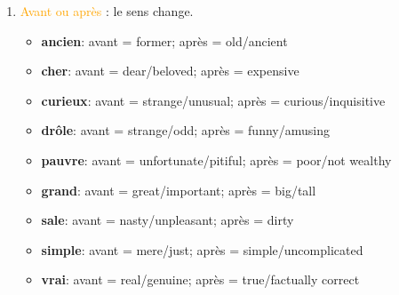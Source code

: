 \documentclass[math,code]{amznotes}
\theoremstyle{remark}
\begin{document}
\begin{enumerate}
    \begin{notebox}
        \begin{enumerate}
            \item \textbf{S'il y a plusieurs adjectifs,} chaque adjectif garde généralement sa place normale :
            \begin{itemize}
                \item de \textcolor{orange}{jeunes} collègues \textcolor{orange}{espagnols}
                \item ces \textcolor{orange}{deux autres} dossiers \textcolor{orange}{rouges}
                \item un collaborateur \textcolor{orange}{sympa} avec de \textcolor{orange}{vraies}\footnote{true, genuine} compétences
            \end{itemize}
            Donc, les adjectifs ne doivent pas nécessairement être tous avant ou tous après le nom.
            \item \textbf{Devant une voyelle ou un ``h'' muet,} ``beau'', ``vieux'', ``nouveau'' deviennent ``bel'', ``vieil'', ``nouvel''!
        \end{enumerate}
        
    \end{notebox}

    \item \textcolor{orange}{Avant ou après} : le sens change.
    \begin{itemize}
        \item \textbf{ancien}: avant = former; après = old/ancient
        \item \textbf{cher}: avant = dear/beloved; après = expensive
        \item \textbf{curieux}: avant = strange/unusual; après = curious/inquisitive
        \item \textbf{drôle}: avant = strange/odd; après = funny/amusing
        \item \textbf{pauvre}: avant = unfortunate/pitiful; après = poor/not wealthy
        \item \textbf{grand}: avant = great/important; après = big/tall
        \item \textbf{sale}: avant = nasty/unpleasant; après = dirty
        \item \textbf{simple}: avant = mere/just; après = simple/uncomplicated
        \item \textbf{vrai}: avant = real/genuine; après = true/factually correct
    \end{itemize}


\end{enumerate}
\end{document}
